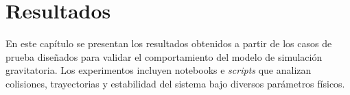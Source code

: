 \chapter{Resultados}
\label{chap:resultados}

En este capítulo se presentan los resultados obtenidos a partir de los casos de prueba diseñados para validar el comportamiento del modelo de simulación gravitatoria. Los experimentos incluyen notebooks e \emph{scripts} que analizan colisiones, trayectorias y estabilidad del sistema bajo diversos parámetros físicos.



